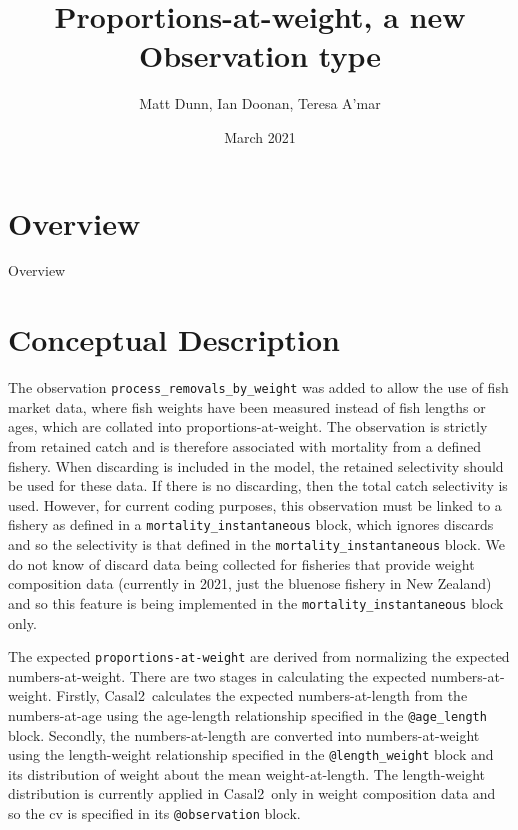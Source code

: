 \documentclass[a4paper,11pt,twoside,pdftex,draft]{article}
\title{Proportions-at-weight, a new Observation type}
\author{Matt Dunn, Ian Doonan, Teresa A'mar}
\date{March 2021}
\newcommand{\CNAME}{Casal2}
\begin{document}
\maketitle

\pagestyle{plain}
\setcounter{page}{1}


\newpage

\section{Overview}

Overview

\section{Conceptual Description}

The observation \texttt{process\_removals\_by\_weight} was added to allow the use of fish market data, where fish weights have been measured instead of fish lengths or ages, which are collated into proportions-at-weight. The observation is strictly from retained catch and is therefore associated with mortality from a defined fishery. When discarding is included in the model, the retained selectivity should be used for these data. If there is no discarding, then the total catch selectivity is used. However, for current coding purposes, this observation must be linked to a fishery as defined in a \texttt{mortality\_instantaneous} block, which ignores discards and so the selectivity is that defined in the \texttt{mortality\_instantaneous} block. We do not know of discard data being collected for fisheries that provide weight composition data (currently in 2021, just the bluenose fishery in New Zealand) and so this feature is being implemented in the \texttt{mortality\_instantaneous} block only.

The expected \texttt{proportions-at-weight} are derived from normalizing the expected numbers-at-weight. There are two stages in calculating the expected numbers-at-weight. Firstly, \CNAME\ calculates the expected numbers-at-length from the numbers-at-age using the age-length relationship specified in the \texttt{@age\_length} block. Secondly, the numbers-at-length are converted into numbers-at-weight using the length-weight relationship specified in the \texttt{@length\_weight} block and its distribution of weight about the mean weight-at-length. The length-weight distribution is currently applied in \CNAME~only in weight composition data and so the cv is specified in its \texttt{@observation} block.
\end{document}
